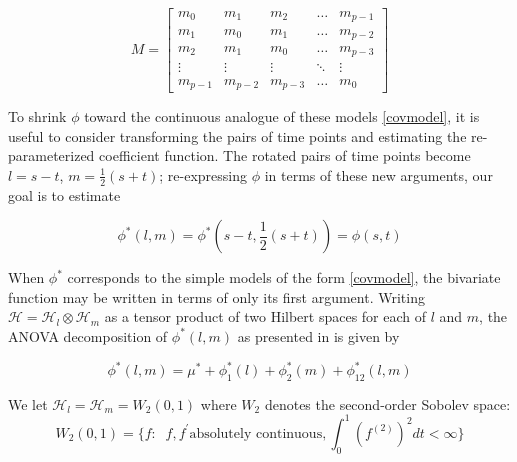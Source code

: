 \documentclass[12pt]{article}
\begin{document}
\begin{equation}
M = \begin{bmatrix} m_0 & m_1 & m_2 & \dots & m_{p-1}\\ m_1 & m_0 & m_1 & \dots & m_{p-2}\\m_2 & m_1 & m_0 & \dots & m_{p-3}\\ \vdots & \vdots & \vdots & \ddots & \vdots\\  m_{p-1} & m_{p-2} & m_{p-3} & \dots & m_0 \end{bmatrix} \label{toeplitz}
\end{equation}


To shrink $\phi$ toward the continuous analogue of these models \eqref{covmodel}, it is useful to consider transforming the pairs of time points and estimating the re-parameterized coefficient function. The rotated pairs of time points become $l = s-t$, $m = \frac{1}{2}\left(s+t\right)$; re-expressing $\phi$ in terms of these new arguments, our goal is to estimate

\begin{equation}
\phi^*\left(l,m\right) = \phi^*\left(s-t, \frac{1}{2}\left(s+t\right)\right) = \phi\left(s,t\right)
\end{equation}

When $\phi^*$ corresponds to the simple models of the form \eqref{covmodel}, the bivariate function may be written in terms of only its first argument. Writing $\mathcal{H} = \mathcal{H}_l \otimes \mathcal{H}_m$ as a tensor product of two Hilbert spaces for each of $l$ and $m$, the ANOVA decomposition of $\phi^*\left(l,m\right) $ as presented in \citet{gu2002smoothing} is given by 

\begin{equation}
\phi^*\left(l,m\right) = \mu^* + \phi_1^*\left(l\right) + \phi_2^*\left(m\right) + \phi_{12}^*\left(l,m\right)   \label{ANOVA}
\end{equation}
\noindent 

We let $\mathcal{H}_l = \mathcal{H}_m = W_2\left(0,1\right)$ where $W_2$ denotes the second-order Sobolev space:
\[
W_2\left(0,1\right) = \lbrace f: \;\;f, f^\prime \mbox{absolutely continuous}, \int_0^1 \left(f^{\left( 2 \right)}\right)^2 dt < \infty \rbrace
\]  
\end{document}
